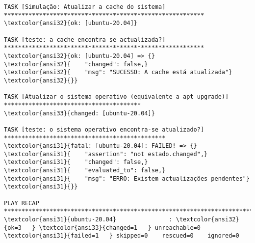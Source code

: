 \documentclass{scrartcl}
\begin{document}
\begin{Verbatim}
TASK [Simulação: Atualizar a cache do sistema] *********************************************************
\textcolor{ansi32}{ok: [ubuntu-20.04]}

TASK [teste: a cache encontra-se actualizada?] *********************************************************
\textcolor{ansi32}{ok: [ubuntu-20.04] => {}
\textcolor{ansi32}{    "changed": false,}
\textcolor{ansi32}{    "msg": "SUCESSO: A cache está atualizada"}
\textcolor{ansi32}{}}

TASK [Atualizar o sistema operativo (equivalente a apt upgrade)] ***************************************
\textcolor{ansi33}{changed: [ubuntu-20.04]}

TASK [teste: o sistema operativo encontra-se atualizado?] **********************************************
\textcolor{ansi31}{fatal: [ubuntu-20.04]: FAILED! => {}
\textcolor{ansi31}{    "assertion": "not estado.changed",}
\textcolor{ansi31}{    "changed": false,}
\textcolor{ansi31}{    "evaluated_to": false,}
\textcolor{ansi31}{    "msg": "ERRO: Existem actualizações pendentes"}
\textcolor{ansi31}{}}

PLAY RECAP *********************************************************************************************
\textcolor{ansi31}{ubuntu-20.04}               : \textcolor{ansi32}{ok=3   } \textcolor{ansi33}{changed=1   } unreachable=0    \textcolor{ansi31}{failed=1   } skipped=0    rescued=0    ignored=0



\end{Verbatim}
\end{document}
